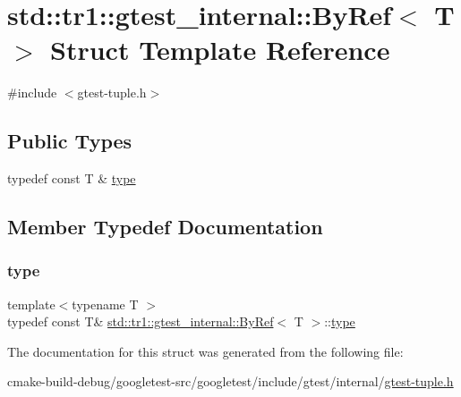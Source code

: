 \hypertarget{structstd_1_1tr1_1_1gtest__internal_1_1ByRef}{}\section{std\+::tr1\+::gtest\+\_\+internal\+::By\+Ref$<$ T $>$ Struct Template Reference}
\label{structstd_1_1tr1_1_1gtest__internal_1_1ByRef}


{\ttfamily \#include $<$gtest-\/tuple.\+h$>$}

\subsection*{Public Types}
\begin{DoxyCompactItemize}
\item 
typedef const T \& \mbox{\hyperlink{structstd_1_1tr1_1_1gtest__internal_1_1ByRef_ac42ad942ee1cfa86b2abcce9b88ac10e}{type}}
\end{DoxyCompactItemize}


\subsection{Member Typedef Documentation}
\mbox{\label{structstd_1_1tr1_1_1gtest__internal_1_1ByRef_ac42ad942ee1cfa86b2abcce9b88ac10e}} 
\subsubsection{\texorpdfstring{type}{type}}
{\footnotesize\ttfamily template$<$typename T $>$ \\
typedef const T\& \mbox{\hyperlink{structstd_1_1tr1_1_1gtest__internal_1_1ByRef}{std\+::tr1\+::gtest\+\_\+internal\+::\+By\+Ref}}$<$ T $>$\+::\mbox{\hyperlink{structstd_1_1tr1_1_1gtest__internal_1_1ByRef_ac42ad942ee1cfa86b2abcce9b88ac10e}{type}}}



The documentation for this struct was generated from the following file\+:\begin{DoxyCompactItemize}
\item 
cmake-\/build-\/debug/googletest-\/src/googletest/include/gtest/internal/\mbox{\hyperlink{gtest-tuple_8h}{gtest-\/tuple.\+h}}\end{DoxyCompactItemize}
